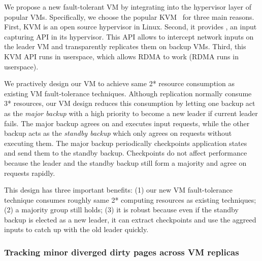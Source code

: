 We propose a new fault-tolerant VM by integrating \falcon into the hypervisor 
layer of popular VMs. Specifically, we choose the popular KVM~\cite{kvm} for 
three main reasons. First, KVM is an open source hypervisor in Linux. 
Second, it provides , an input capturing API in its hypervisor. 
This API allows \falcon to intercept network inputs on the leader VM and 
transparently replicates them on backup VMs. Third, this KVM API runs in 
userspace, which allows RDMA to work (RDMA runs in userspace).

We practively design our VM to achieve same 2* resource consumption as 
existing VM fault-tolerance techniques. Although \paxos replication 
normally consume 3* resources, our VM design reduces this consumption 
by letting one backup act as the \emph{major backup} with a high priority to 
become a new leader if current leader fails. The major backup agrees on and 
executes input requests, while the other backup acts as the \emph{standby 
backup} which only agrees on requests without executing them. The major backup 
periodically checkpoints application states and send them to the 
standby backup. Checkpoints do not affect performance because the leader and 
the standby backup still form a majority and agree on requests rapidly.


This design has three important benefits: (1) our new VM fault-tolerance 
technique consumes roughly same 2* computing resources as existing 
techniques; (2) a \paxos majority group still holds; (3) it is robust 
because even if the standby backup is elected as a new leader, it can extract 
checkpoints and use the aggreed inputs to catch up with the old leader quickly.



\vspace{-.15in}\subsubsection{Tracking minor diverged dirty pages across VM 
replicas}
\label{sec:tracking}\vspace{-.075in}

